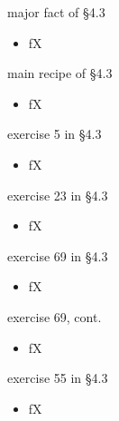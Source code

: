 \documentclass{beamer}
\begin{document}
\begin{frame}{major fact of \S4.3}

\begin{itemize}
\item fX
\end{itemize}
\end{frame}


\begin{frame}{main recipe of \S4.3}

\begin{itemize}
\item fX
\end{itemize}
\end{frame}


\begin{frame}{exercise 5 in \S4.3}

\begin{itemize}
\item fX
\end{itemize}
\end{frame}


\begin{frame}{exercise 23 in \S4.3}

\begin{itemize}
\item fX
\end{itemize}
\end{frame}


\begin{frame}{exercise 69 in \S4.3}

\begin{itemize}
\item fX
\end{itemize}
\end{frame}


\begin{frame}{exercise 69, cont.}

\begin{itemize}
\item fX
\end{itemize}
\end{frame}


\begin{frame}{exercise 55 in \S4.3}

\begin{itemize}
\item fX
\end{itemize}
\end{frame}
\end{document}
